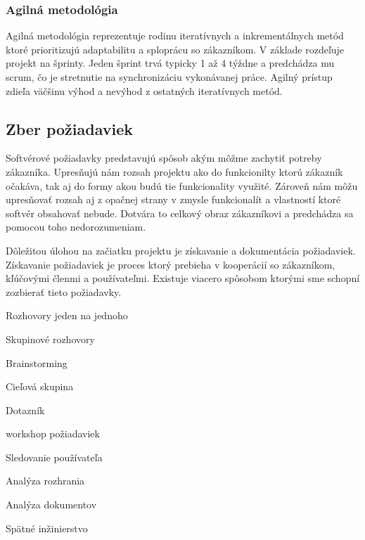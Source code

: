 
\subsubsection{Agilná metodológia}
Agilná metodológia reprezentuje rodinu iteratívnych a inkrementálnych metód ktoré prioritizujú adaptabilitu a sploprácu so zákazníkom. V základe rozdeľuje projekt na šprinty. Jeden šprint trvá typicky 1 až 4 týždne a predchádza mu scrum, čo je stretnutie na synchronizáciu vykonávanej práce. Agilný prístup zdieľa väčšinu výhod a nevýhod z ostatných iteratívnych metód.\cite{sdlc}


\subsection{Zber požiadaviek}
Softvérové požiadavky predstavujú spôsob akým môžme zachytiť potreby zákazníka. Upresňujú nám rozsah projektu ako do funkcionilty ktorú zákazník očakáva, tak aj do formy akou budú tie funkcionality využité. Zároveň nám môžu upresňovať rozsah aj z opačnej strany v zmysle funkcionalít a vlastností ktoré softvér obsahovať nebude. Dotvára to celkový obraz zákazníkovi a predchádza sa pomocou toho nedorozumeniam. 

Dôležitou úlohou na začiatku projektu je získavanie a dokumentácia požiadaviek. Získavanie požiadaviek je proces ktorý prebieha v kooperácií so zákazníkom, kľúčovými členmi a používateľmi. Existuje viacero spôsobom ktorými sme schopní zozbierať tieto požiadavky.

Rozhovory jeden na jednoho

Skupinové rozhovory

Brainstorming

Cieľová skupina

Dotazník

workshop požiadaviek

Sledovanie používateľa

Analýza rozhrania

Analýza dokumentov

Spätné inžinierstvo

